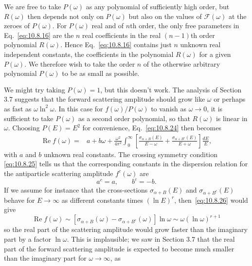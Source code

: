 We are free to take $P(\omega)$ as any polynomial of sufficiently high order,
but $R(\omega)$ then depends not only on $P(\omega)$ but also on the values
of $\mathcal F(\omega)$ at the zeroes of $P(\omega)$. For $P(\omega)$ real
and of $n$th order, the only free parameters in Eq.~\eqref{eq:10.8.16} are
the $n$ real coefficients in the real $(n-1)$th order polynomial $R(\omega)$.
Hence Eq.~\eqref{eq:10.8.16} contains just $n$ unknown real independent
constants, the coefficients in the polynomial $R(\omega)$ for a given
$P(\omega)$. We therefore wish to take the order $n$ of the otherwise
arbitrary polynomial $P(\omega)$ to be as small as possible.

We might try taking $P(\omega)=1$, but this doesn't work. The analysis of
Section 3.7 suggests that the forward scattering amplitude should grow like
$\omega$ or perhaps as fast as $\omega\ln^2\omega$. In this case for
$f(\omega)/P(\omega)$ to vanish as $\omega\to0$, it is sufficient to take
$P(\omega)$ as a second order polynomial, so that $R(\omega)$ is linear in
$\omega$. Choosing $P(E)=E^2$ for convenience, Eq.~\eqref{eq:10.8.24}
then becomes
\begin{align}
  \operatorname{Re}f(\omega)={}&a+b\omega
  +\frac{\omega^2}{4\pi^2}\int_0^\infty
  \left[\frac{\sigma_{\alpha+B}(E)}{E-\omega}
  +\frac{\sigma_{\alpha+B^c}(E)}{E+\omega}\right]\frac{dE}{E},
  \tag{10.8.26}\label{eq:10.8.26}
\end{align}
with $a$ and $b$ unknown real constants. The crossing symmetry condition
\eqref{eq:10.8.25} tells us that the corresponding constants in the dispersion
relation for the antiparticle scattering amplitude $f^c(\omega)$ are
\begin{equation}
  a^c=a,\qquad b^c=-b.
  \tag{10.8.27}\label{eq:10.8.27}
\end{equation}
If we assume for instance that the cross-sections $\sigma_{\alpha+B}(E)$ and
$\sigma_{\alpha+B^c}(E)$ behave for $E\to\infty$ as different constants
times $(\ln E)^r$, then~\eqref{eq:10.8.26} would give
\begin{equation}
  \operatorname{Re}f(\omega)\sim
  [\sigma_{\alpha+B}(\omega)-\sigma_{\alpha+B^c}(\omega)]\ln\omega
  \sim\omega(\ln\omega)^{r+1}
  \tag{10.8.28}\label{eq:10.8.28}
\end{equation}
so the real part of the scattering amplitude would grow faster than the
imaginary part by a factor $\ln\omega$. This is implausible; we saw in Section
3.7 that the real part of the forward scattering amplitude is expected to
become much smaller than the imaginary part for $\omega\to\infty$, as
